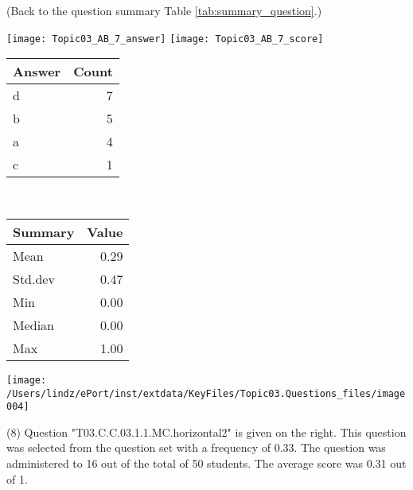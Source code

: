 \documentclass[12pt,english,nohyper]{tufte-handout}\usepackage[]{graphicx}\usepackage[]{color}
\begin{document}
 (Back to the question summary Table \ref{tab:summary_question}.)

\begin{center} \texttt{[image: Topic03\_AB\_7\_answer]} \texttt{[image: Topic03\_AB\_7\_score]} \end{center} 

\begin{center}%
\begin{tabular}{lr}
  \hline
Answer & Count \\ 
  \hline
d &   7 \\ 
  b &   5 \\ 
  a &   4 \\ 
  c &   1 \\ 
   \hline
\end{tabular}
~~~~~~~~%
\begin{tabular}{lr}
  \hline
Summary & Value \\ 
  \hline
Mean & 0.29 \\ 
  Std.dev & 0.47 \\ 
  Min & 0.00 \\ 
  Median & 0.00 \\ 
  Max & 1.00 \\ 
   \hline
\end{tabular}
\end{center}\newpage{}



\vspace{4cm}\begin{marginfigure}\texttt{[image: /Users/lindz/ePort/inst/extdata/KeyFiles/Topic03.Questions\_files/image004]}\end{marginfigure}\vspace{-4cm} (8) Question "T03.C.C.03.1.1.MC.horizontal2" is given on the right. This question was selected from the question set with a frequency of 0.33. The question was administered to 16 out of the total of 50 students. The average score was 0.31 out of 1.
\end{document}
